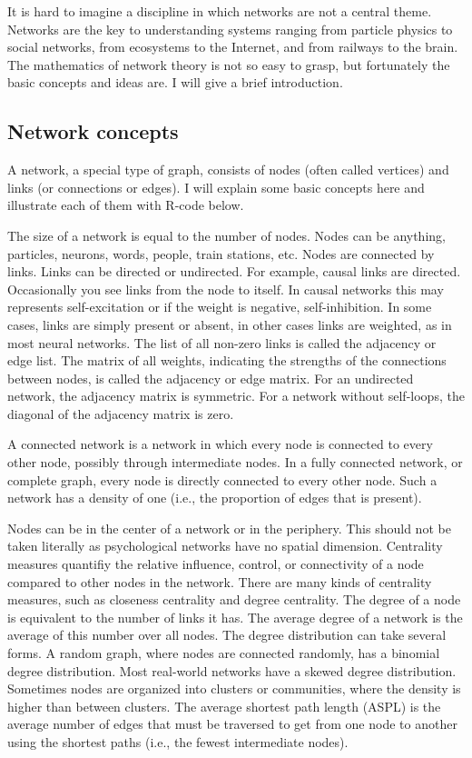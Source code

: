 \documentclass[
  letterpaper,
]{scrbook}
\begin{document}
It is hard to imagine a discipline in which networks are not a central
theme. Networks are the key to understanding systems ranging from
particle physics to social networks, from ecosystems to the Internet,
and from railways to the brain. The mathematics of network theory is not
so easy to grasp, but fortunately the basic concepts and ideas are. I
will give a brief introduction.

\hypertarget{network-concepts}{%
\subsection{Network concepts}\label{network-concepts}}

A network, a special type of graph, consists of nodes (often called
vertices) and links (or connections or edges). I will explain some basic
concepts here and illustrate each of them with R-code below.

The size of a network is equal to the number of nodes. Nodes can be
anything, particles, neurons, words, people, train stations, etc. Nodes
are connected by links. Links can be directed or undirected. For
example, causal links are directed. Occasionally you see links from the
node to itself. In causal networks this may represents self-excitation
or if the weight is negative, self-inhibition. In some cases, links are
simply present or absent, in other cases links are weighted, as in most
neural networks. The list of all non-zero links is called the adjacency
or edge list. The matrix of all weights, indicating the strengths of the
connections between nodes, is called the adjacency or edge matrix. For
an undirected network, the adjacency matrix is symmetric. For a network
without self-loops, the diagonal of the adjacency matrix is zero.

A connected network is a network in which every node is connected to
every other node, possibly through intermediate nodes. In a fully
connected network, or complete graph, every node is directly connected
to every other node. Such a network has a density of one (i.e., the
proportion of edges that is present).

Nodes can be in the center of a network or in the periphery. This should
not be taken literally as psychological networks have no spatial
dimension. Centrality measures quantifiy the relative influence,
control, or connectivity of a node compared to other nodes in the
network. There are many kinds of centrality measures, such as closeness
centrality and degree centrality. The degree of a node is equivalent to
the number of links it has. The average degree of a network is the
average of this number over all nodes. The degree distribution can take
several forms. A random graph, where nodes are connected randomly, has a
binomial degree distribution. Most real-world networks have a skewed
degree distribution. Sometimes nodes are organized into clusters or
communities, where the density is higher than between clusters. The
average shortest path length (ASPL) is the average number of edges that
must be traversed to get from one node to another using the shortest
paths (i.e., the fewest intermediate nodes).
\end{document}
